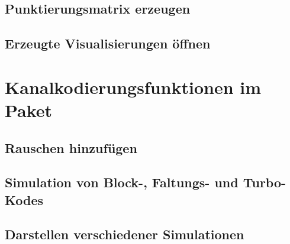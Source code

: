 \subsection{Punktierungsmatrix erzeugen}
\label{sec:interface_punctuation}


\subsection{Erzeugte Visualisierungen öffnen}
\label{sec:interface_openPDF}


\section{Kanalkodierungsfunktionen im Paket}
\label{sec:interface_channelFunctions}

\subsection{Rauschen hinzufügen}
\label{sec:interface_applyNoise}


\subsection{Simulation von Block-, Faltungs- und Turbo-Kodes}
\label{sec:interface_channelcodingSimulation}


\subsection{Darstellen verschiedener Simulationen}
\label{sec:interface_plotSimulationData}
